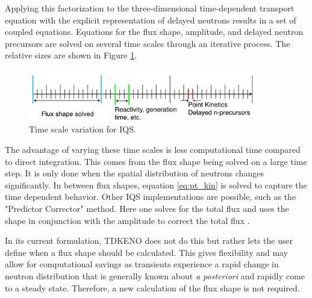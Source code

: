\documentclass[11pt]{article}
\begin{document}
Applying this factorization to the three-dimensional time-dependent transport equation with the explicit representation of delayed neutrons results in a set of coupled equations.  Equations for the flux shape, amplitude, and delayed neutron precursors are solved on several time scales through an iterative process. The relative sizes are shown in Figure \ref{fig:time_scale}. 

\begin{figure}[h]
    \centering
    \includegraphics[width=10cm]{figures/time_scale.pdf}
    \caption{Time scale variation for IQS.}
    \label{fig:time_scale}
\end{figure}

The advantage of varying these time scales is less computational time compared to direct integration.  This comes from the flux shape being solved on a large time step. It is only done when the spatial distribution of neutrons changes significantly.  In between flux shapes, equation \ref{eq:pt_kin} is solved to capture the time dependent behavior.  Other IQS implementations are possible, such as the "Predictor Corrector" method.  Here one solves for the total flux and uses the shape in conjunction with the amplitude to correct the total flux \cite{Dulla}.  

 In its current formulation, TDKENO does not do this but rather lets the user define when a flux shape should be calculated.  This gives flexibility and may allow for computational savings as transients experience a rapid change in neutron distribution that is generally known about \emph{a posteriori} and rapidly come to a steady state. Therefore, a new calculation of the flux shape is not required.
\end{document}
